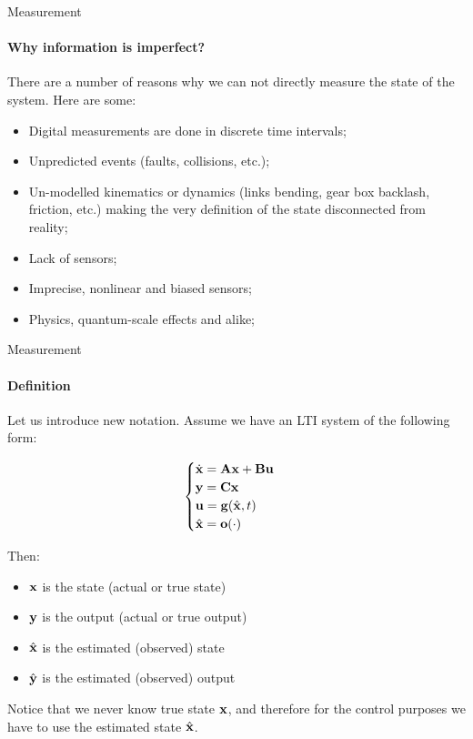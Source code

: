 \documentclass{beamer}
\begin{document}
\begin{frame}{Measurement}
\framesubtitle{Why information is imperfect?}
\begin{flushleft}

There are a number of reasons why we can not directly measure the state of the system. Here are some:

\begin{itemize}
\item Digital measurements are done in discrete time intervals;
\item Unpredicted events (faults, collisions, etc.);
\item Un-modelled kinematics or dynamics (links bending, gear box backlash,  friction, etc.) making the very definition of the state disconnected from reality;
\item Lack of sensors;
\item Imprecise, nonlinear and biased sensors;
\item Physics, quantum-scale effects and alike;
\end{itemize}

\end{flushleft}
\end{frame}

\begin{frame}{Measurement}
\framesubtitle{Definition}
\begin{flushleft}

Let us introduce new notation. Assume we have an LTI system of the following form:

\begin{equation}
\begin{cases}
\dot {\mathbf{x}} = \mathbf{A} \mathbf{x} + \mathbf{B} \mathbf{u} \\
\mathbf{y} = \mathbf{C} \mathbf{x} \\
\mathbf{u} = \mathbf{g}(\hat{\mathbf{x}}, t)\\
\hat{\mathbf{x}} = \mathbf{o}(\cdot)
\end{cases}
\end{equation}

Then:

\begin{itemize}
\item $\mathbf{x}$ is the state (actual or true state)
\item $\mathbf{y}$ is the output (actual or true output)
\item $\hat{\mathbf{x}}$ is the estimated (observed) state
\item $\hat{\mathbf{y}}$ is the estimated (observed) output
\end{itemize}

Notice that we never know true state $\mathbf{x}$, and therefore for the control purposes we have to use the estimated state $\hat{\mathbf{x}}$.

\end{flushleft}
\end{frame}
\end{document}
